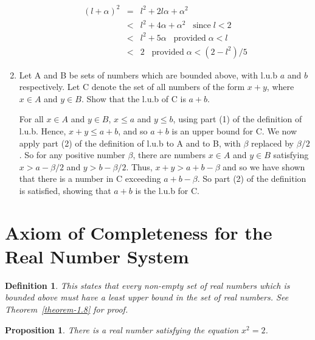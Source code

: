 \message{ !name(RealAnalysis.tex)}\documentclass[12pt]{scrbook}
\newtheorem*{definition}{Definition}
\newtheorem{proposition}{Proposition}[section]
\begin{document}
\begin{enumerate}
	\begin{eqnarray*}
	(l + \alpha)^2 	&=& l^2 + 2 l \alpha  + \alpha^2 \\
				&<& l^2 + 4 \alpha + \alpha^2 \;\;\; \text{since} \; l < 2 \\
				&<&  l^2 + 5 \alpha \;\;\; \text{provided} \; \alpha < l \\
				&<&  2 \;\;\;  \text{provided} \; \alpha < (2 - l^2)/5
	\end{eqnarray*}
	
	
	\item Let A and B be sets of numbers which are bounded above, with l.u.b $a$ and $b$ respectively.  Let C denote the set of all numbers of the form $x + y$, where $x \in A$ and $y \in B$.  Show that the l.u.b of C is $a + b$.
	
	For all $x \in A$ and $y \in B$, $x \leq a$ and $y \leq b$, using part (1) of the definition of l.u.b.  Hence, $x + y \leq a + b$, and so $a + b$ is an upper bound for C.  We now apply part (2) of the definition of l.u.b to A and to B, with $\beta$ replaced by $\beta/2$.  So for any positive number $\beta$, there are numbers $x \in A$ and $y \in B$ satisfying $x > a - \beta/2$ and $y > b - \beta/2$.  Thus, $ x + y > a + b - \beta $ and so we have shown that there is a number in C exceeding $ a + b - \beta $.  So part (2) of the definition is satisfied, showing that $a + b$ is the l.u.b for C.
	
\end{enumerate}

\section{Axiom of Completeness for the Real Number System}

\begin{definition}
	This states that every non-empty set of real numbers which is bounded above must have a least upper bound in the set of real numbers.  See Theorem~\ref{theorem-1.8} for proof.
\end{definition}

\begin{proposition}
\label{prop-sqrt-two}
There is a real number satisfying the equation $x^2 = 2$.
\end{proposition}
\end{document}
